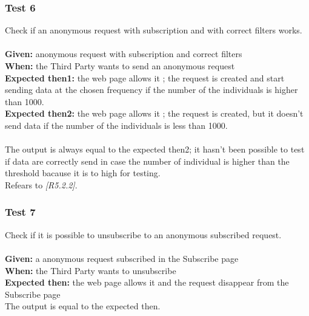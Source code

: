 \subsubsection{\Large{Test 6}}
Check if an anonymous request with subscription and with correct filters works.\\
\\
\textbf{Given: } anonymous request with subscription and correct filters\\
\textbf{When: } the Third Party wants to send an anonymous request\\
\textbf{Expected then1: }the web page allows it ; the request is created and start sending data at the chosen frequency if the number of the individuals is higher than 1000.\\
\textbf{Expected then2: }the web page allows it ; the request is created, but it doesn't send data if the number of the individuals is less than 1000.\\
\\
The output is always equal to the expected then2; it hasn't been possible to test if data are correctly send in case the number of individual is higher than the threshold bacause it is to high for testing.\\
Refears to \textit{[R5.2.2]}.

\subsubsection{\Large{Test 7}}
Check if it is possible to unsubscribe to an anonymous subscribed request.\\
\\
\textbf{Given: } a anonymous request subscribed in the Subscribe page \\
\textbf{When: } the Third Party wants to unsubscribe\\
\textbf{Expected then: } the web page allows it and the request disappear from the Subscribe page\\
The output is equal to the expected then.

